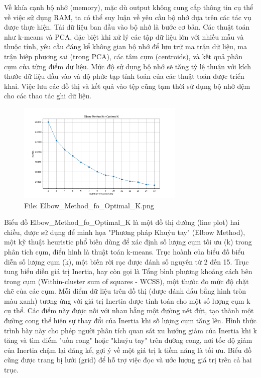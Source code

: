 \documentclass[12pt]{report}
\begin{document}
{Về khía cạnh bộ nhớ (memory), mặc dù output không cung cấp thông tin cụ thể về việc sử dụng RAM, ta có thể suy luận về yêu cầu bộ nhớ dựa trên các tác vụ được thực hiện. Tải dữ liệu ban đầu vào bộ nhớ là bước cơ bản. Các thuật toán như k-means và PCA, đặc biệt khi xử lý các tập dữ liệu lớn với nhiều mẫu và thuộc tính, yêu cầu đáng kể không gian bộ nhớ để lưu trữ ma trận dữ liệu, ma trận hiệp phương sai (trong PCA), các tâm cụm (centroids), và kết quả phân cụm của từng điểm dữ liệu. Mức độ sử dụng bộ nhớ sẽ tăng tỷ lệ thuận với kích thước dữ liệu đầu vào và độ phức tạp tính toán của các thuật toán được triển khai. Việc lưu các đồ thị và kết quả vào tệp cũng tạm thời sử dụng bộ nhớ đệm cho các thao tác ghi dữ liệu.
\\
\begin{figure}[h]
    \centering
    \includegraphics[width=300px]{Elbow_Method_fo_Optimal_K.png}
    \caption{File: Elbow\_Method\_fo\_Optimal\_K.png}
    \label{fig:Elbow}
\end{figure}
Biểu đồ Elbow\_Method\_fo\_Optimal\_K là một đồ thị đường (line plot) hai chiều, được sử dụng để minh họa "Phương pháp Khuỷu tay" (Elbow Method), một kỹ thuật heuristic phổ biến dùng để xác định số lượng cụm tối ưu (k) trong phân tích cụm, điển hình là thuật toán k-means. Trục hoành của biểu đồ biểu diễn số lượng cụm (k), một biến rời rạc được đánh số nguyên từ 2 đến 15. Trục tung biểu diễn giá trị Inertia, hay còn gọi là Tổng bình phương khoảng cách bên trong cụm (Within-cluster sum of squares - WCSS), một thước đo mức độ chặt chẽ của các cụm. Mỗi điểm dữ liệu trên đồ thị (được đánh dấu bằng hình tròn màu xanh) tương ứng với giá trị Inertia được tính toán cho một số lượng cụm k cụ thể. Các điểm này được nối với nhau bằng một đường nét đứt, tạo thành một đường cong thể hiện sự thay đổi của Inertia khi số lượng cụm tăng lên. Hình thức trình bày này cho phép người phân tích quan sát xu hướng giảm của Inertia khi k tăng và tìm điểm "uốn cong" hoặc "khuỷu tay" trên đường cong, nơi tốc độ giảm của Inertia chậm lại đáng kể, gợi ý về một giá trị k tiềm năng là tối ưu. Biểu đồ cũng được trang bị lưới (grid) để hỗ trợ việc đọc và ước lượng giá trị trên cả hai trục.
}
\end{document}
